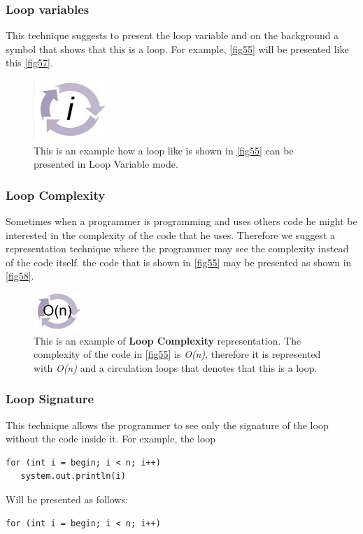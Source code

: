 \subsubsection{Loop variables}
This technique suggests to present the loop variable and on the background a symbol that shows that this is a loop. For example, \autoref{fig55} will be presented like this \autoref{fig57}.
\begin{figure}[H]
\includegraphics{"./fig/Loop Variable"}
\caption{This is an example how a loop like is shown in \autoref{fig55} can be presented in Loop Variable mode.}
\label{fig57}
\end{figure}
\subsubsection{Loop Complexity}
Sometimes when a programmer is programming and uses others code he might be interested in the complexity of the code that he uses. Therefore we suggest a representation technique where the programmer may see the complexity instead of the code itself. the code that is shown in \autoref{fig55} may be presented as shown in \autoref{fig58}.
\begin{figure}[H]
\includegraphics{"./fig/Code Complexity Representation"}
\caption{This is an example of \textbf{Loop Complexity} representation. The complexity of the code in \autoref{fig55} is \textit{O(n)}, therefore it is represented with \textit{O(n)} and a circulation loops that denotes that this is a loop.}
\label{fig58}
\end{figure}
\subsubsection{Loop Signature}
This technique allows the programmer to see only the signature of the loop without the code inside it. For example, the loop 
\begin{lstlisting}
for (int i = begin; i < n; i++)
   system.out.println(i)
\end{lstlisting}
Will be presented as follows:
\begin{lstlisting}
for (int i = begin; i < n; i++)
\end{lstlisting}
